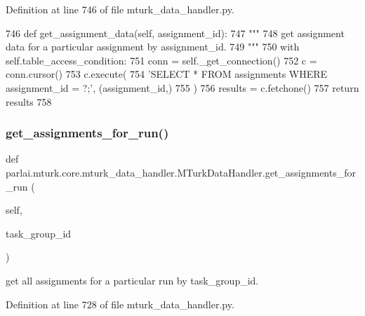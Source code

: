 Definition at line 746 of file mturk\+\_\+data\+\_\+handler.\+py.


\begin{DoxyCode}
746     \textcolor{keyword}{def }get\_assignment\_data(self, assignment\_id):
747         \textcolor{stringliteral}{"""}
748 \textcolor{stringliteral}{        get assignment data for a particular assignment by assignment\_id.}
749 \textcolor{stringliteral}{        """}
750         with self.table\_access\_condition:
751             conn = self.\_get\_connection()
752             c = conn.cursor()
753             c.execute(
754                 \textcolor{stringliteral}{'SELECT * FROM assignments WHERE assignment\_id = ?;'}, (assignment\_id,)
755             )
756             results = c.fetchone()
757             \textcolor{keywordflow}{return} results
758 
\end{DoxyCode}
\mbox{\label{classparlai_1_1mturk_1_1core_1_1mturk__data__handler_1_1MTurkDataHandler_ad08412db3d132299e287f182fef8b6dc}} 
\subsubsection{\texorpdfstring{get\+\_\+assignments\+\_\+for\+\_\+run()}{get\_assignments\_for\_run()}}
{\footnotesize\ttfamily def parlai.\+mturk.\+core.\+mturk\+\_\+data\+\_\+handler.\+M\+Turk\+Data\+Handler.\+get\+\_\+assignments\+\_\+for\+\_\+run (\begin{DoxyParamCaption}\item[{}]{self,  }\item[{}]{task\+\_\+group\+\_\+id }\end{DoxyParamCaption})}

\begin{DoxyVerb}get all assignments for a particular run by task_group_id.
\end{DoxyVerb}
 

Definition at line 728 of file mturk\+\_\+data\+\_\+handler.\+py.


